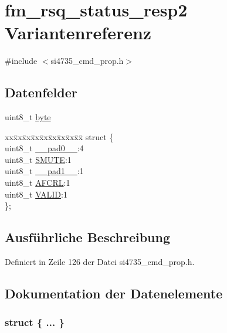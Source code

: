 \hypertarget{unionfm__rsq__status__resp2}{}\section{fm\+\_\+rsq\+\_\+status\+\_\+resp2 Variantenreferenz}
\label{unionfm__rsq__status__resp2}


{\ttfamily \#include $<$si4735\+\_\+cmd\+\_\+prop.\+h$>$}

\subsection*{Datenfelder}
\begin{DoxyCompactItemize}
\item 
uint8\+\_\+t \hyperlink{unionfm__rsq__status__resp2_a96f44d20f1dbf1c8785a7bc99a46164c}{byte}
\item 
\begin{tabbing}
xx\=xx\=xx\=xx\=xx\=xx\=xx\=xx\=xx\=\kill
struct \{\\
\>uint8\_t \hyperlink{unionfm__rsq__status__resp2_a8b4eebe79ded0459acec2f4950102ba3}{\_\_pad0\_\_}:4\\
\>uint8\_t \hyperlink{unionfm__rsq__status__resp2_a6f4b6956b747e720f4c2eb97e84be9df}{SMUTE}:1\\
\>uint8\_t \hyperlink{unionfm__rsq__status__resp2_a77f12d2e278bd5c07712648ac0df5e08}{\_\_pad1\_\_}:1\\
\>uint8\_t \hyperlink{unionfm__rsq__status__resp2_aec3ecfbd976645f2d3d4067f32271635}{AFCRL}:1\\
\>uint8\_t \hyperlink{unionfm__rsq__status__resp2_a58bd81dc31c117b187f38fbc118b393e}{VALID}:1\\
\}; \\

\end{tabbing}\end{DoxyCompactItemize}


\subsection{Ausführliche Beschreibung}


Definiert in Zeile 126 der Datei si4735\+\_\+cmd\+\_\+prop.\+h.



\subsection{Dokumentation der Datenelemente}
\hypertarget{unionfm__rsq__status__resp2_af20b69b7061069690584e525673b877f}{}\subsubsection[{"@17}]{\setlength{\rightskip}{0pt plus 5cm}struct \{ ... \} }\label{unionfm__rsq__status__resp2_af20b69b7061069690584e525673b877f}
\hypertarget{unionfm__rsq__status__resp2_a8b4eebe79ded0459acec2f4950102ba3}{}
